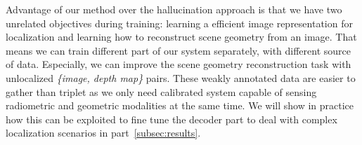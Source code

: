 Advantage of our method over the hallucination approach is that we have two unrelated objectives during training: learning a efficient image representation for localization and learning how to reconstruct scene geometry from an image. That means we can train different part of our system separately, with different source of data. Especially, we can improve the scene geometry reconstruction task with unlocalized \textit{\{image, depth map\}} pairs. These weakly annotated data are easier to gather than triplet as we only need calibrated system capable of sensing radiometric and geometric modalities at the same time. We will show in practice how this can be exploited to fine tune the decoder part to deal with complex localization scenarios in part~\ref{subsec:results}.

